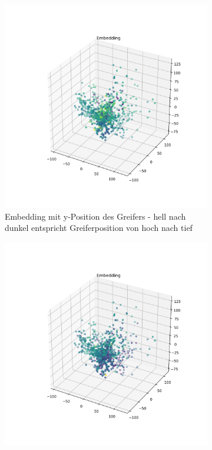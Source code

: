 	  \begin{figure}[h]
		\centering
		\begin{subfigure}[c]{0.49\textwidth}			
			\includegraphics[width=1\textwidth,center]{bilder/Hauptteil/Autoencoder_Grappel_Detection/Embedding_y.png}
			\caption{Embedding mit y-Position des Greifers - hell nach dunkel entspricht Greiferposition von hoch nach tief}
			\label{img:Emb_y_AE}	
		\end{subfigure}
		\begin{subfigure}[c]{0.49\textwidth}			
			\includegraphics[width=1\textwidth, center]{bilder/Hauptteil/Autoencoder_Grappel_Detection/Embedding_x.png}

\end{subfigure}
\end{figure}
